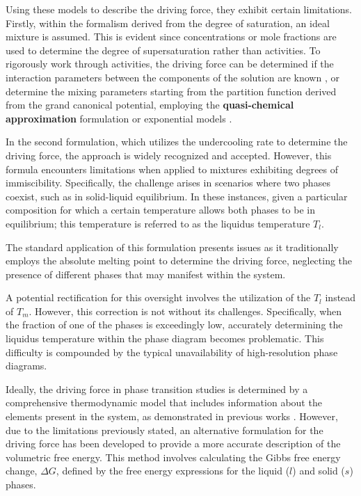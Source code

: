 Using these models to describe the driving force, they exhibit certain limitations. Firstly, within the formalism derived from the degree of saturation, an ideal mixture is assumed. This is evident since concentrations or mole fractions are used to determine the degree of supersaturation rather than activities. To rigorously work through activities, the driving force can be determined if the interaction parameters between the components of the solution are known \cite{Bartels1991}, or determine the mixing parameters starting from the partition function derived from the grand canonical potential, employing the \textbf{quasi-chemical approximation} formulation \cite{Odusote2020} or exponential models \cite{Yadav2023}.

In the second formulation, which utilizes the undercooling rate to determine the driving force, the approach is widely recognized and accepted. However, this formula encounters limitations when applied to mixtures exhibiting degrees of immiscibility. Specifically, the challenge arises in scenarios where two phases coexist, such as in solid-liquid equilibrium. In these instances, given a particular composition for which a certain temperature allows both phases to be in equilibrium; this temperature is referred to as the liquidus temperature \(T_l\).

The standard application of this formulation presents issues as it traditionally employs the absolute melting point to determine the driving force, neglecting the presence of different phases that may manifest within the system.

A potential rectification for this oversight involves the utilization of the \(T_l\) instead of \(T_m\). However, this correction is not without its challenges. Specifically, when the fraction of one of the phases is exceedingly low, accurately determining the liquidus temperature within the phase diagram becomes problematic. This difficulty is compounded by the typical unavailability of high-resolution phase diagrams.


Ideally, the driving force in phase transition studies is determined by a comprehensive thermodynamic model that includes information about the elements present in the system, as demonstrated in previous works \cite{Was1985, Kumar1996}. However, due to the limitations previously stated, an alternative formulation for the driving force has been developed to provide a more accurate description of the volumetric free energy. This method involves calculating the Gibbs free energy change, \(\Delta G\), defined by the free energy expressions for the liquid (\(l\)) and solid (\(s\)) phases.

